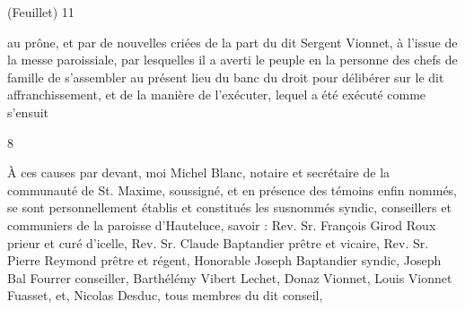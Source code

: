 \documentclass[a4paper,twoside,openany]{article}
\begin{document}

\begin{flushright}
(Feuillet) 11
\end{flushright}
au \gls{prône}, et par de nouvelles criées de la part du
dit Sergent Vionnet, à l’issue de la messe paroissiale,
par lesquelles il a averti le peuple en la personne des
chefs de famille de s’assembler au présent lieu du
banc du droit pour délibérer sur le dit affranchissement,
et de la manière de l’exécuter, lequel a été exécuté
comme s’ensuit

\begin{center}
8
\end{center}
À ces causes par devant, moi Michel Blanc, notaire 
et secrétaire de la communauté de St. Maxime,
soussigné, et en présence des témoins enfin nommés, se
sont personnellement établis et constitués les susnommés
syndic, conseillers et communiers de la paroisse
d’Hauteluce, savoir : 
Rev. Sr. François Girod Roux prieur et curé d’icelle, 
Rev. Sr. Claude Baptandier prêtre et vicaire, 
Rev. Sr. Pierre Reymond prêtre et régent, 
Honorable Joseph Baptandier syndic, 
Joseph Bal Fourrer conseiller, 
Barthélémy Vibert  Lechet, 
Donaz Vionnet, 
Louis Vionnet Fuasset, 
et, 
Nicolas Desduc, 
tous membres du dit conseil,
\\
\end{document}
